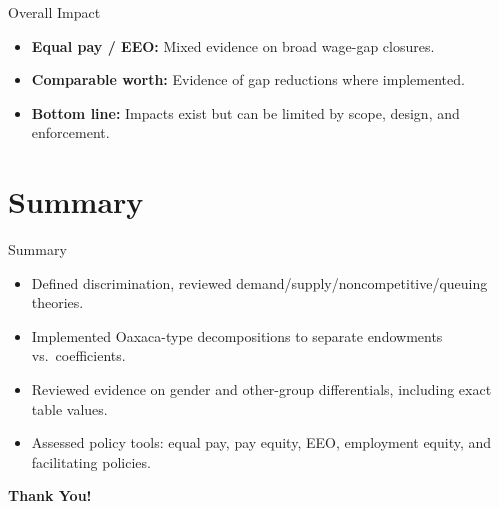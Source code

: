 \documentclass[aspectratio=169]{beamer}
\begin{document}
\begin{frame}{Overall Impact}
\transfade
\begin{itemize}[<+->]
  \item \textbf{Equal pay / EEO:} Mixed evidence on broad wage-gap closures.
  \item \textbf{Comparable worth:} Evidence of gap reductions where implemented.
  \item \textbf{Bottom line:} Impacts exist but can be limited by scope, design, and enforcement.
\end{itemize}
\end{frame}

\section{Summary}

\begin{frame}{Summary}
\transfade
\begin{itemize}[<+->]
  \item Defined discrimination, reviewed demand/supply/noncompetitive/queuing theories.
  \item Implemented Oaxaca-type decompositions to separate endowments vs.\ coefficients.
  \item Reviewed evidence on gender and other-group differentials, including exact table values.
  \item Assessed policy tools: equal pay, pay equity, EEO, employment equity, and facilitating policies.
\end{itemize}
\end{frame}

\begin{frame}
\centering
\Huge{\textbf{Thank You!}} \\

\end{frame}
\end{document}
